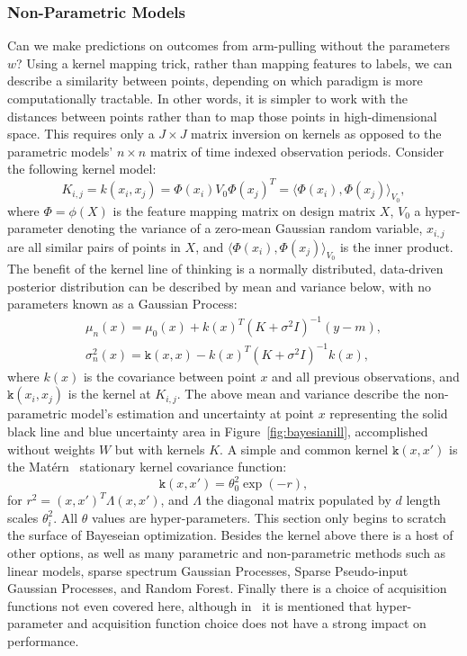 \subsubsection{Non-Parametric Models}
Can we make predictions on outcomes from arm-pulling without the parameters $w$? Using a kernel mapping trick, rather than mapping features to labels, we can describe a similarity between points, depending on which paradigm is more computationally tractable. In other words, it is simpler to work with the distances between points rather than to map those points in high-dimensional space. This requires only a $J \times J$ matrix inversion on kernels as opposed to the parametric models' $n \times n$ matrix of time indexed observation periods. Consider the following kernel model:
\begin{equation}
\label{eq:kernel}
K_{i,j} = k(x_i,x_j) = \Phi(x_i)V_0 \Phi(x_j)^T = \langle \Phi(x_i), \Phi(x_j) \rangle_{V_0},
\end{equation}
where $\Phi=\phi(X)$ is the feature mapping matrix on design matrix $X$, $V_0$ a hyper-parameter denoting the variance of a zero-mean Gaussian random variable, $x_{i,j}$ are all similar pairs of points in $X$, and $\langle \Phi(x_i), \Phi(x_j) \rangle_{V_0}$ is the inner product. The benefit of the kernel line of thinking is a normally distributed, data-driven posterior distribution can be described by mean and variance below, with no parameters known as a Gaussian Process:
\begin{subequations}
\label{eq:noparamposterior}
\begin{align}
\mu_n(x)=\mu_0(x)+k(x)^T(K+\sigma^2 I)^{-1} (y-m),
\\
\sigma_n^2(x)=\mathtt{k}(x,x)-k(x)^T(K+\sigma^2I)^{-1} k(x),
\end{align}
\end{subequations}
where $k(x)$ is the covariance between point $x$ and all previous observations, and $\mathtt{k}(x_i,x_j)$ is the kernel at $K_{i,j}$. The above mean and variance describe the non-parametric model's estimation and uncertainty at point $x$ representing the solid black line and blue uncertainty area in Figure~\ref{fig:bayesianill}, accomplished without weights $W$ but with kernels $K$. A simple and common kernel $\mathtt{k}(x,x')$ is the Mat\'ern~\cite{matern} stationary kernel covariance function:
\begin{equation}
\label{eq:matern}
\mathtt{k}(x,x') = \theta_0^2 \exp(-r),
\end{equation}
for $r^2= (x,x')^T \Lambda (x,x')$, and $\Lambda$ the diagonal matrix populated by $d$ length scales $\theta_i^2$. All $\theta$ values are hyper-parameters. This section only begins to scratch the surface of Bayeseian optimization. Besides the kernel above there is a host of other options, as well as many parametric and non-parametric methods such as linear models, sparse spectrum Gaussian Processes, Sparse Pseudo-input Gaussian Processes, and Random Forest. Finally there is a choice of acquisition functions not even covered here, although in~\cite{bayesian} it is mentioned that hyper-parameter and acquisition function choice does not have a strong impact on performance.

